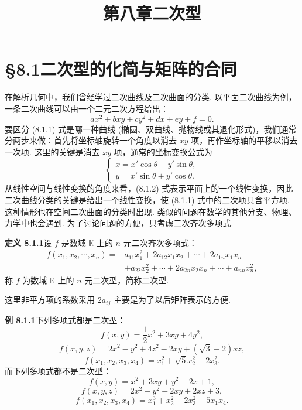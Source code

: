 \documentclass[UTF8, 12pt, fontset=fandol, oneside]{ctexart}
\title{第八章\quad 二次型}
\author{}
\date{}
\begin{document}
\maketitle

\section*{§8.1\quad 二次型的化简与矩阵的合同}

在解析几何中，我们曾经学过二次曲线及二次曲面的分类. 以平面二次曲线为例，一条二次曲线可以由一个二元二次方程给出：
\begin{equation}
ax^2+bxy+cy^2+dx+ey+f=0.
\tag{8.1.1}
\end{equation}
要区分 (8.1.1) 式是哪一种曲线 (椭圆、双曲线、抛物线或其退化形式)，我们通常分两步来做：首先将坐标轴旋转一个角度以消去 $xy$ 项，再作坐标轴的平移以消去一次项. 这里的关键是消去 $xy$ 项，通常的坐标变换公式为
\begin{equation}
\left\{\begin{array}{l}
x=x'\cos\theta-y'\sin\theta,\\
y=x'\sin\theta+y'\cos\theta.
\end{array}\right.
\tag{8.1.2}
\end{equation}
从线性空间与线性变换的角度来看，(8.1.2) 式表示平面上的一个线性变换，因此二次曲线分类的关键是给出一个线性变换，使 (8.1.1) 式中的二次项只含平方项. 这种情形也在空间二次曲面的分类时出现. 类似的问题在数学的其他分支、物理、力学中也会遇到. 为了讨论问题的方便，只考虑二次齐次多项式.

\noindent\textbf{定义 8.1.1}\quad 设 $f$ 是数域 $\mathbb K$ 上的 $n$ 元二次齐次多项式：
\begin{equation}
\begin{aligned}
f(x_1,x_2,\cdots,x_n)
={}&a_{11}x_1^2+2a_{12}x_1x_2+\cdots+2a_{1n}x_1x_n\\
&+a_{22}x_2^2+\cdots+2a_{2n}x_2x_n+\cdots+a_{nn}x_n^2,
\end{aligned}
\tag{8.1.3}
\end{equation}
称 $f$ 为数域 $\mathbb K$ 上的 $n$ 元二次型，简称二次型.

这里非平方项的系数采用 $2a_{ij}$ 主要是为了以后矩阵表示的方便.

\noindent\textbf{例 8.1.1}\quad 下列多项式都是二次型：
\[
f(x,y)=\frac12x^2+3xy+4y^2,
\]
\[
f(x,y,z)=2x^2-y^2+4z^2-2xy+(\sqrt3+2)xz,
\]
\[
f(x_1,x_2,x_3,x_4)=x_1^2+\sqrt5x_2^2-2x_3^2.
\]
而下列多项式都不是二次型：
\[
f(x,y)=x^2+3xy+y^2-2x+1,
\]
\[
f(x,y,z)=2x^2-y^2-2xy+2xz+3,
\]
\[
f(x_1,x_2,x_3,x_4)=x_1^3+x_2^2-2x_3^2+5x_1x_4.
\]
\end{document}
